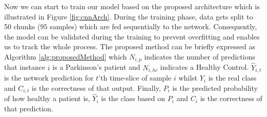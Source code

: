 \documentclass[a4paper,fleqn]{cas-dc}
\begin{document}
Now we can start to train our model based on the proposed architecture which is illustrated in Figure \ref{fig:cnnArch}. During the training phase, data gets split to 50 chunks ($95$ samples) which are fed sequentially to the network. Consequently, the model can be validated during the training to prevent overfitting and enables us to track the whole process. The proposed method can be briefly expressed as Algorithm \ref{alg:proposedMethod} which $N_{i,p}$ indicates the number of predictions that instance $i$ is a Parkinson's patient and $N_{i,hc}$ indicates a Healthy Control. $\hat{Y}_{i,t}$ is the network prediction for $t$'th time-slice of sample $i$ whilst $Y_i$ is the real class and $C_{i,t}$ is the correctness of that output. Finally, $P_i$ is the predicted probability of how healthy a patient is, $\hat{Y}_i$ is the class based on $P_i$ and $C_i$ is the correctness of that prediction.
\end{document}
